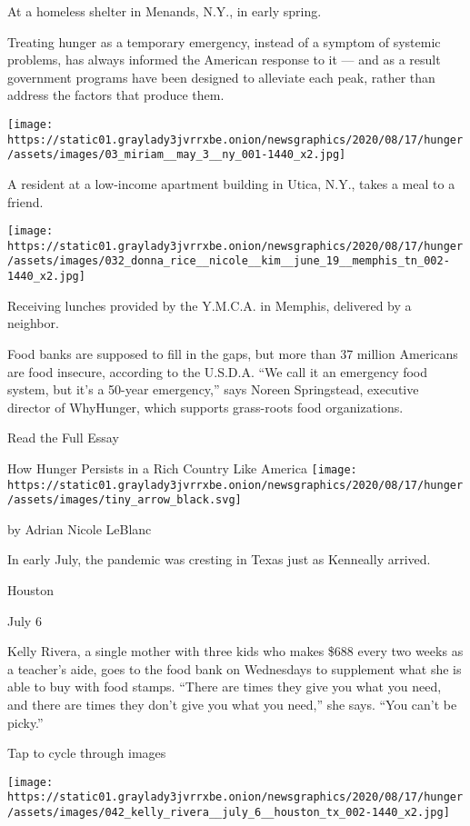 At a homeless shelter in Menands, N.Y., in early spring.

Treating hunger as a temporary emergency, instead of a symptom of
systemic problems, has always informed the American response to it ---
and as a result government programs have been designed to alleviate each
peak, rather than address the factors that produce them.

\texttt{[image: https://static01.graylady3jvrrxbe.onion/newsgraphics/2020/08/17/hunger/assets/images/03\_miriam\_\_may\_3\_\_ny\_001-1440\_x2.jpg]}

A resident at a low-income apartment building in Utica, N.Y., takes a
meal to a friend.

\texttt{[image: https://static01.graylady3jvrrxbe.onion/newsgraphics/2020/08/17/hunger/assets/images/032\_donna\_rice\_\_nicole\_\_kim\_\_june\_19\_\_memphis\_tn\_002-1440\_x2.jpg]}

Receiving lunches provided by the Y.M.C.A. in Memphis, delivered by a
neighbor.

Food banks are supposed to fill in the gaps, but more than 37 million
Americans are food insecure, according to the U.S.D.A. ``We call it an
emergency food system, but it's a 50-year emergency,'' says Noreen
Springstead, executive director of WhyHunger, which supports grass-roots
food organizations.

Read the Full Essay

\href{https://www.nytimes3xbfgragh.onion/2020/09/02/magazine/food-security-united-states.html}{}

How Hunger Persists in a Rich Country Like America
\texttt{[image: https://static01.graylady3jvrrxbe.onion/newsgraphics/2020/08/17/hunger/assets/images/tiny\_arrow\_black.svg]}

by Adrian Nicole LeBlanc

In early July, the pandemic was cresting in Texas just as Kenneally
arrived.

Houston

July 6

Kelly Rivera, a single mother with three kids who makes \$688 every two
weeks as a teacher's aide, goes to the food bank on Wednesdays to
supplement what she is able to buy with food stamps. ``There are times
they give you what you need, and there are times they don't give you
what you need,'' she says. ``You can't be picky.''

Tap to cycle through images

\texttt{[image: https://static01.graylady3jvrrxbe.onion/newsgraphics/2020/08/17/hunger/assets/images/042\_kelly\_rivera\_\_july\_6\_\_houston\_tx\_002-1440\_x2.jpg]}


